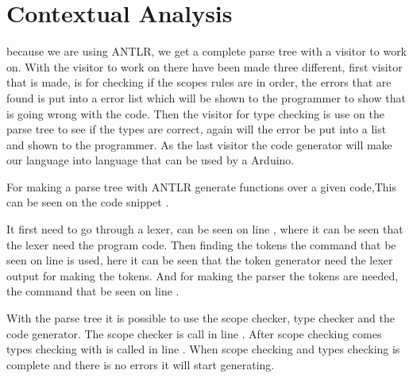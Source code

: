 \section{Contextual Analysis}
because we are using ANTLR, we get a complete parse tree with a visitor to work on. With the visitor to work on there have been made three different, first visitor that is made, is for checking if the scopes rules are in order, the errors that are found is put into a error list which will be shown to the programmer to show that is going wrong with the code. Then the visitor for type checking is use on the parse tree to see if the types are correct, again will the error be put into a list and shown to the programmer. As the last visitor the code generator will make our language into language that can be used by a Arduino.

For making a parse tree with ANTLR generate functions over a given code,This can be seen on the code snippet .

It first need to go through a lexer, can be seen on line , where it can be seen that the lexer need the program code. Then finding the tokens the command that be seen on line  is used, here it can be seen that the token generator need the lexer output for making the tokens. And for making the parser the tokens are needed, the command that be seen on line .

With the parse tree it is possible to use the scope checker, type checker and the code generator. The scope checker is call in line . After scope checking comes types checking with is called in line . When scope checking and types checking is complete and there is no errors it will start generating.